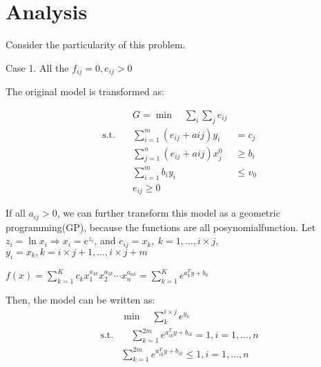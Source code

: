 \documentclass[UTF8]{article}
\numberwithin{equation}{section}
\begin{document}
\section{Analysis}

Consider the particularity of this problem.








Case 1. All the $f_{ij} = 0, e_{ij} > 0$

The original model is transformed as:

\begin{equation}
\begin{align*}
&G =  \min \quad \sum_i \sum_j e_{ij} \\
\mathrm{s.t.}  \quad &\sum_{i=1}^m (e_{ij} + a{ij})y_i & = c_j \\
&\sum_{j=1}^n (e_{ij} + a{ij})x_j^0 & \geq b_i \\
&\sum_{i=1}^m b_i y_i & \leq v_0 \\
&e_{ij} \geq 0
\end{align*}
\end{equation}

If all $a_{ij} > 0$, we can further transform this model as a geometric programming(GP), because the functions are all posynomialfunction.
Let $z_i = \ln x_i \Rightarrow x_i = e^{z_i}$, and $e_{ij} = x_k,~ k=1,\ldots,i\times j$, $y_i = x_k, k=i\times j+1,\ldots,i\times j+m$

$f(x)=\sum_{k=1}^{K} c_{k} x_{1}^{a_{1 k}} x_{2}^{a_{2 k}} \cdots x_{n}^{a_{n k}}=\sum_{k=1}^{K} e^{a_{k}^{T} y+b_{k}}$


Then, the model can be written as:
\begin{equation}
\begin{align}
&\min \quad \sum_k^{i\times j} e^{y_k} \\
\mathrm{s.t.}& \quad \sum_{k=1}^{2m} e^{a_{ik}^{T} y+b_{ik}} = 1, i =1,\ldots,n \\
&\sum_{k=1}^{2m} e^{a_{ik}^{T} y+b_{ik}} \leq 1, i =1,\ldots,n \\
\end{align}
\end{equation}
\end{document}
